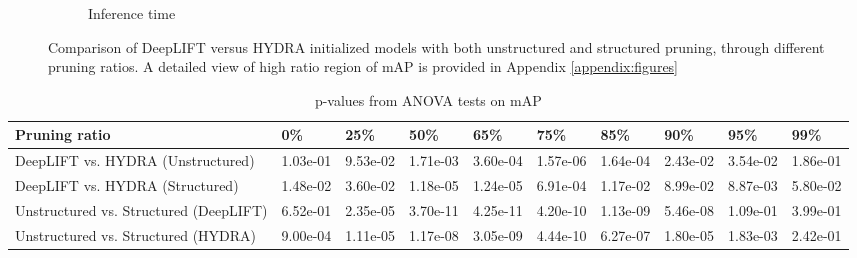 \documentclass[journal,onecolumn,12pt]{IEEEtran}
\begin{document}
\begin{figure}
\begin{subfigure}[b]{.5\textwidth}
      \caption{Inference time}
      \label{fig:time1}
    \end{subfigure}
    \caption{Comparison of DeepLIFT versus HYDRA initialized models with both unstructured and structured pruning, through different pruning ratios. A detailed view of high ratio region of mAP is provided in Appendix \ref{appendix:figures}}
    \label{fig:result1}
\end{figure}



\begin{table}[htbp]
    \caption{p-values from ANOVA tests on mAP}
    \begin{center}
    \begin{tabular}{ |p{3cm}|p{1.2cm}|p{1.2cm}|p{1.2cm}|p{1.2cm}|p{1.2cm}|p{1.2cm}|p{1.2cm}|p{1.2cm}|p{1.2cm}|  }
     \hline
     Pruning ratio  & 0\% & 25\%& 50\%& 65\%& 75\%& 85\%& 90\%& 95\%& 99\%\\
     \hline
     DeepLIFT vs. HYDRA (Unstructured)    & 1.03e-01& 9.53e-02& 1.71e-03& 3.60e-04& 1.57e-06& 1.64e-04& 2.43e-02& 3.54e-02& 1.86e-01 \\
     DeepLIFT vs. HYDRA (Structured)     & 1.48e-02& 3.60e-02& 1.18e-05& 1.24e-05& 6.91e-04& 1.17e-02& 8.99e-02& 8.87e-03& 5.80e-02\\
     \hline
     Unstructured vs. Structured (DeepLIFT)      & 6.52e-01& 2.35e-05& 3.70e-11& 4.25e-11&4.20e-10& 1.13e-09& 5.46e-08& 1.09e-01&3.99e-01 \\
     Unstructured vs. Structured (HYDRA)    & 9.00e-04& 1.11e-05& 1.17e-08& 3.05e-09&4.44e-10& 6.27e-07& 1.80e-05& 1.83e-03&2.42e-01\\
     \hline
    \end{tabular}
    \end{center}
    \label{tab:p-mAP}
\end{table}
\end{document}
